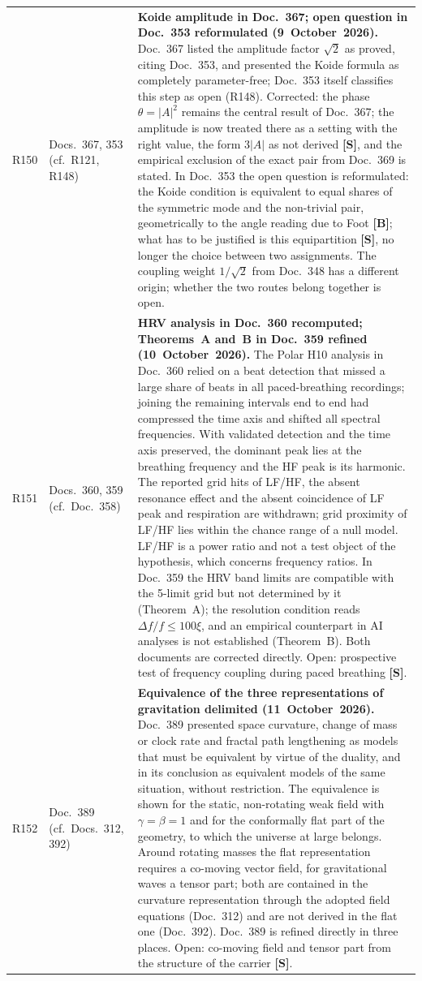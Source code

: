 \begin{longtable}{@{}p{0.9cm}p{3.1cm}p{10.2cm}@{}}
R150 & Docs.~367, 353 (cf.\ R121, R148) & \textbf{Koide amplitude in Doc.~367; open question in Doc.~353 reformulated (9~October~2026).} Doc.~367 listed the amplitude factor $\sqrt2$ as proved, citing Doc.~353, and presented the Koide formula as completely parameter-free; Doc.~353 itself classifies this step as open (R148). Corrected: the phase $\theta=|A|^2$ remains the central result of Doc.~367; the amplitude is now treated there as a setting with the right value, the form $3|A|$ as not derived \textbf{[S]}, and the empirical exclusion of the exact pair from Doc.~369 is stated. In Doc.~353 the open question is reformulated: the Koide condition is equivalent to equal shares of the symmetric mode and the non-trivial pair, geometrically to the angle reading due to Foot \textbf{[B]}; what has to be justified is this equipartition \textbf{[S]}, no longer the choice between two assignments. The coupling weight $1/\sqrt2$ from Doc.~348 has a different origin; whether the two routes belong together is open. \\
R151 & Docs.~360, 359 (cf.\ Doc.~358) & \textbf{HRV analysis in Doc.~360 recomputed; Theorems~A and~B in Doc.~359 refined (10~October~2026).} The Polar H10 analysis in Doc.~360 relied on a beat detection that missed a large share of beats in all paced-breathing recordings; joining the remaining intervals end to end had compressed the time axis and shifted all spectral frequencies. With validated detection and the time axis preserved, the dominant peak lies at the breathing frequency and the HF peak is its harmonic. The reported grid hits of LF/HF, the absent resonance effect and the absent coincidence of LF peak and respiration are withdrawn; grid proximity of LF/HF lies within the chance range of a null model. LF/HF is a power ratio and not a test object of the hypothesis, which concerns frequency ratios. In Doc.~359 the HRV band limits are compatible with the 5-limit grid but not determined by it (Theorem~A); the resolution condition reads $\Delta f/f\le100\xi$, and an empirical counterpart in AI analyses is not established (Theorem~B). Both documents are corrected directly. Open: prospective test of frequency coupling during paced breathing \textbf{[S]}. \\
R152 & Doc.~389 (cf.\ Docs.~312, 392) & \textbf{Equivalence of the three representations of gravitation delimited (11~October~2026).} Doc.~389 presented space curvature, change of mass or clock rate and fractal path lengthening as models that must be equivalent by virtue of the duality, and in its conclusion as equivalent models of the same situation, without restriction. The equivalence is shown for the static, non-rotating weak field with $\gamma=\beta=1$ and for the conformally flat part of the geometry, to which the universe at large belongs. Around rotating masses the flat representation requires a co-moving vector field, for gravitational waves a tensor part; both are contained in the curvature representation through the adopted field equations (Doc.~312) and are not derived in the flat one (Doc.~392). Doc.~389 is refined directly in three places. Open: co-moving field and tensor part from the structure of the carrier \textbf{[S]}. \\

\end{longtable}
